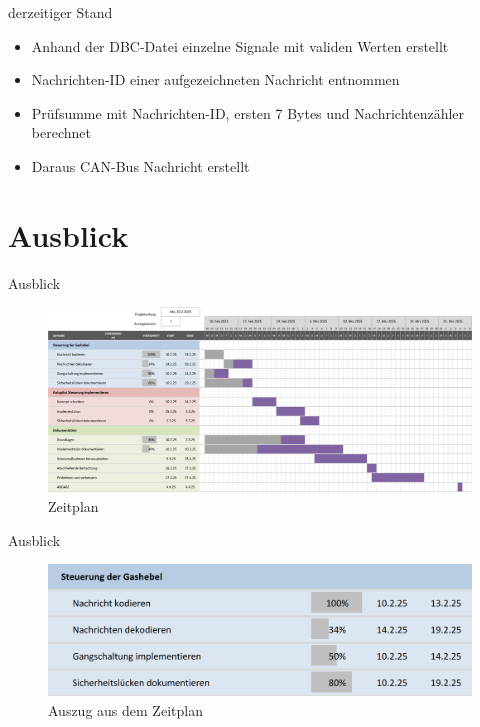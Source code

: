 \documentclass[usenames, dvipsnames, aspectratio=75]{beamer}
\begin{document}
\begin{frame}{derzeitiger Stand}
    \begin{itemize}
        \item Anhand der DBC-Datei einzelne Signale mit validen Werten erstellt
        \item Nachrichten-ID einer aufgezeichneten Nachricht entnommen
        \item Prüfsumme mit Nachrichten-ID, ersten 7 Bytes und Nachrichtenzähler berechnet
        \item Daraus CAN-Bus Nachricht erstellt
    \end{itemize}
    
\end{frame}


\section{Ausblick}
\begin{frame}{Ausblick}
    \begin{figure}
        \centering
        \includegraphics[width=1\linewidth]{assets/Zeitplan.png}
        \caption{Zeitplan}
    \end{figure}
\end{frame}

\begin{frame}{Ausblick}
    \begin{figure}
        \centering
        \includegraphics[width=1\linewidth]{assets/zeitplan1.png}
        \caption{Auszug aus dem Zeitplan}
    \end{figure}
\end{frame}
\end{document}
